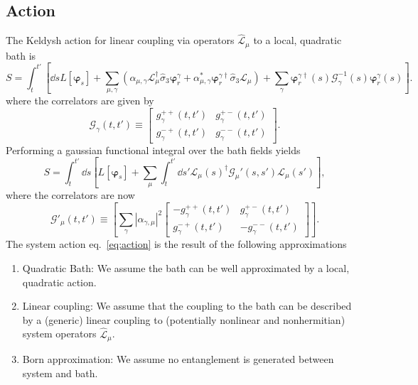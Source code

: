 \documentclass{article}
\let\vec\bm
\begin{document}
\subsection{Action}
The Keldysh action for linear coupling via operators $\hat{\mathcal{L}}_\mu$ to a local, quadratic bath is
\begin{equation}
    S = \int_t^{t'}\left[ \dd{s} L[\vec{\varphi}_s] +  \sum_{\mu, \gamma} \left(\alpha_{\mu, \gamma}\vec{\mathcal{L}}^\dagger_\mu \hat{\sigma}_3 \vec{\varphi}_r^\gamma + \alpha_{\mu, \gamma}^* \vec{\varphi}^{\gamma\dagger}_r \hat{\sigma}_3 \vec{\mathcal{L}}_\mu \right) + \sum_\gamma \vec{\varphi}^{\gamma\dagger}_r(s) \mathcal{G}_{\gamma}^{-1}(s) \vec{\varphi}_r^\gamma(s)\right].
\end{equation}
where the correlators are given by
\begin{equation}
    \mathcal{G}_{\gamma}(t, t') 
    \equiv 
    \begin{bmatrix}
        g_{\gamma}^{++}(t, t') & g_{\gamma}^{+-}(t, t') \\
        g_{\gamma}^{-+}(t, t') & g_{\gamma}^{--}(t, t') 
    \end{bmatrix}.
\end{equation}
Performing a gaussian functional integral over the bath fields yields
\begin{equation}
    S = \int_t^{t'} \dd{s}\left[L[\vec{\varphi}_s] +  \sum_\mu \int_t^{t'}\dd{s'} \vec{\mathcal{L}}_\mu(s)^\dagger \mathcal{G}_\mu'(s, s') \vec{\mathcal{L}}_\mu(s')\right],\nonumber\label{eq:action}
\end{equation}
where the correlators are now
\begin{equation}
    \mathcal{G}'_\mu(t, t') \equiv \left[\sum_{\gamma}|\alpha_{\gamma, \mu}|^2 \begin{bmatrix} -g_\gamma^{++}(t, t') & g_\gamma^{+-}(t, t') \\ g_\gamma^{-+}(t, t') & -g_\gamma^{--}(t, t')\end{bmatrix} \right].
\end{equation}
The system action eq.~\ref{eq:action} is the result of the following approximations
\begin{enumerate}
        \item Quadratic Bath: We assume the bath can be well approximated by a local, quadratic action.
        \item Linear coupling: We assume that the coupling to the bath can be described by a (generic) linear coupling to (potentially nonlinear and nonhermitian) system operators $\hat{\mathcal{L}}_\mu$.
        \item Born approximation: We assume no entanglement is generated between system and bath.
\end{enumerate}
\end{document}

